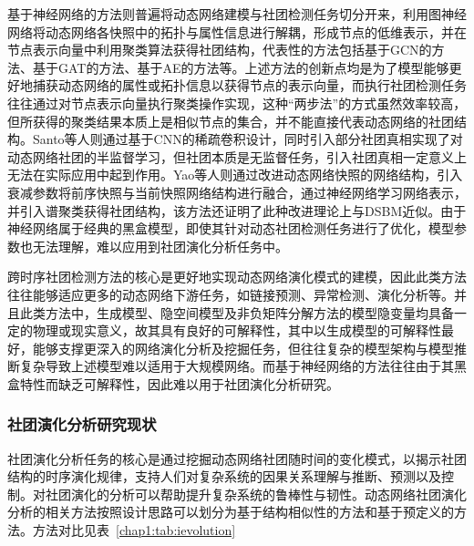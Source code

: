 基于神经网络的方法则普遍将动态网络建模与社团检测任务切分开来，利用图神经网络将动态网络各快照中的拓扑与属性信息进行解耦，形成节点的低维表示，并在节点表示向量中利用聚类算法获得社团结构，代表性的方法包括基于GCN的方法\cite{ma2020streaming,pareja2020evolvegcn}、基于GAT的方法\cite{sankar2018dynamic,cui2019hierarchical}、基于AE的方法\cite{goyal2018dyngem,yu2018netwalk,zhao2019large,goyal2020dyngraph2vec}等。上述方法的创新点均是为了模型能够更好地捕获动态网络的属性或拓扑信息以获得节点的表示向量，而执行社团检测任务往往通过对节点表示向量执行聚类操作实现，这种“两步法”的方式虽然效率较高，但所获得的聚类结果本质上是相似节点的集合，并不能直接代表动态网络的社团结构。Santo等人\cite{de2021deep}则通过基于CNN的稀疏卷积设计，同时引入部分社团真相实现了对动态网络社团的半监督学习，但社团本质是无监督任务，引入社团真相一定意义上无法在实际应用中起到作用。Yao等人\cite{yao2021interpretable}则通过改进动态网络快照的网络结构，引入衰减参数将前序快照与当前快照网络结构进行融合，通过神经网络学习网络表示，并引入谱聚类获得社团结构，该方法还证明了此种改进理论上与DSBM近似。由于神经网络属于经典的黑盒模型，即使其针对动态社团检测任务进行了优化，模型参数也无法理解，难以应用到社团演化分析任务中。

跨时序社团检测方法的核心是更好地实现动态网络演化模式的建模，因此此类方法往往能够适应更多的动态网络下游任务，如链接预测、异常检测、演化分析等。并且此类方法中，生成模型、隐空间模型及非负矩阵分解方法的模型隐变量均具备一定的物理或现实意义，故其具有良好的可解释性，其中以生成模型的可解释性最好，能够支撑更深入的网络演化分析及挖掘任务，但往往复杂的模型架构与模型推断复杂导致上述模型难以适用于大规模网络。而基于神经网络的方法往往由于其黑盒特性而缺乏可解释性，因此难以用于社团演化分析研究。




\subsubsection{社团演化分析研究现状}

社团演化分析任务的核心是通过挖掘动态网络社团随时间的变化模式，以揭示社团结构的时序演化规律，支持人们对复杂系统的因果关系理解与推断、预测以及控制。对社团演化的分析可以帮助提升复杂系统的鲁棒性与韧性。动态网络社团演化分析的相关方法按照设计思路可以划分为基于结构相似性的方法和基于预定义的方法。方法对比见表~\ref{chap1:tab:ievolution}

